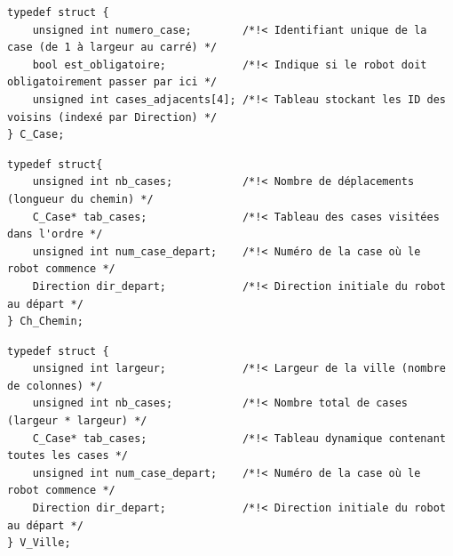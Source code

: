 \begin{lstlisting}[caption={structure dans case.h}]
typedef struct {
    unsigned int numero_case;        /*!< Identifiant unique de la case (de 1 à largeur au carré) */
    bool est_obligatoire;            /*!< Indique si le robot doit obligatoirement passer par ici */
    unsigned int cases_adjacents[4]; /*!< Tableau stockant les ID des voisins (indexé par Direction) */
} C_Case;
\end{lstlisting}

\begin{lstlisting}[caption={structure dans chemin.h}]
typedef struct{
    unsigned int nb_cases;           /*!< Nombre de déplacements (longueur du chemin) */
    C_Case* tab_cases;               /*!< Tableau des cases visitées dans l'ordre */
    unsigned int num_case_depart;    /*!< Numéro de la case où le robot commence */
    Direction dir_depart;            /*!< Direction initiale du robot au départ */
} Ch_Chemin;
\end{lstlisting}

\begin{lstlisting}[caption={structure dans ville.h}]
typedef struct {
    unsigned int largeur;            /*!< Largeur de la ville (nombre de colonnes) */
    unsigned int nb_cases;           /*!< Nombre total de cases (largeur * largeur) */
    C_Case* tab_cases;               /*!< Tableau dynamique contenant toutes les cases */
    unsigned int num_case_depart;    /*!< Numéro de la case où le robot commence */
    Direction dir_depart;            /*!< Direction initiale du robot au départ */
} V_Ville;
\end{lstlisting}
